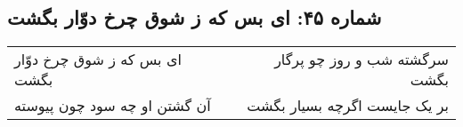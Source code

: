 \begin{center}
\section*{شماره ۴۵: ای بس که ز شوق چرخ دوّار بگشت}
\label{sec:045}
\begin{longtable}{l p{0.5cm} r}
ای بس که ز شوق چرخ دوّار بگشت
&&
سرگشته شب و روز چو پرگار بگشت
\\
آن گشتن او چه سود چون پیوسته
&&
بر یک جایست اگرچه بسیار بگشت
\\
\end{longtable}
\end{center}
